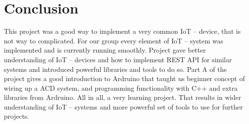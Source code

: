 \section{Conclusion}
\label{sec:conclusion}

This project was a good way to implement a very common IoT – device, that is not way to complicated. For our group every element of IoT – system was implemented and is currently running smoothly. Project gave better understanding of IoT – devices and how to implement REST API for similar systems and introduced powerful libraries and tools to do so. Part A of the project gives a good introduction to Ardruino that taught us beginner concept of wiring up a ACD system, and programming functionality  with C++ and extra libraries from Ardruino. All in all, a very learning project. That results in wider understanding of IoT – systems and more powerful set of tools to use for further projects.
